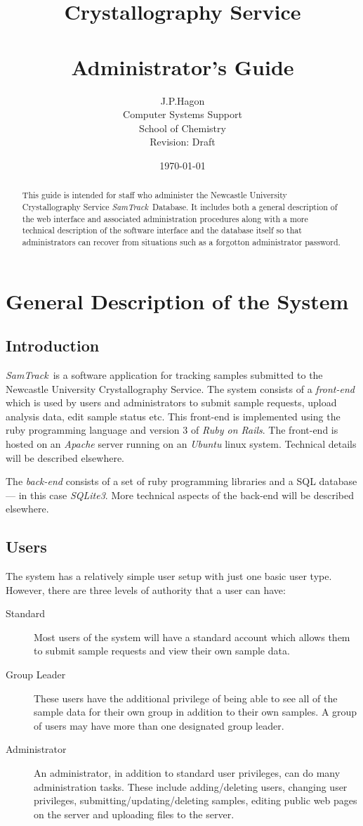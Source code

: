 \documentclass[12pt,twoside]{article}
\title{\sffamily\bfseries Crystallography Service \\ \samtrack\\ Administrator's Guide}
\author{J.P.Hagon\\Computer Systems Support\\School of Chemistry\\
Revision: Draft}
\date{\today}
\newcommand{\samtrack}{\emph{SamTrack}}
\begin{document}
\maketitle
\begin{abstract}
This guide is intended for staff who administer the Newcastle University
Crystallography Service \samtrack\ Database.
It includes both a general description of the web interface and 
associated administration procedures along with a more technical
description of the software interface and the database itself so that
administrators can recover from situations such as a forgotton
administrator password.
\end{abstract}
\tableofcontents
\listoffigures
\listoftables
\newpage
\section{General Description of the System}
\subsection{Introduction}
\samtrack\ is a software application for tracking samples submitted to
the Newcastle University Crystallography Service.
The system consists of a \emph{front-end} which is used by users
and administrators to submit sample requests, upload analysis data,
edit sample status etc.  This front-end is implemented using the 
ruby\cite{rubybook,ruby} programming language and 
version 3 of \emph{Ruby on Rails}\cite{railsbook,rails}.
The front-end is hosted on an \emph{Apache}\cite{apache} server running on an
\emph{Ubuntu}\cite{ubuntu} linux system. 
Technical details will be described elsewhere.

The \emph{back-end} consists of a set of ruby programming libraries
and a SQL database --- in this case 
\emph{SQLite3}\cite{sqlite}.
More technical aspects of the back-end will be described elsewhere.

\subsection{Users}

The system has a relatively simple user setup with just one basic user
type. However, there are three levels of authority that a user can have:
\begin{description}
\item[Standard]
Most users of the system will have a standard account which allows them
to submit sample requests and view their own sample data.
\item[Group Leader]
These users have the additional privilege of being able to see all
of the sample data for their own group in addition to their own
samples. A group of users may have more than one designated group leader.
\item[Administrator]
An administrator, in addition to standard user privileges, can do many
administration tasks. These include adding/deleting users, changing user
privileges, submitting/updating/deleting samples, editing public web
pages on the server and uploading files to the server.
\end{description}
\end{document}
